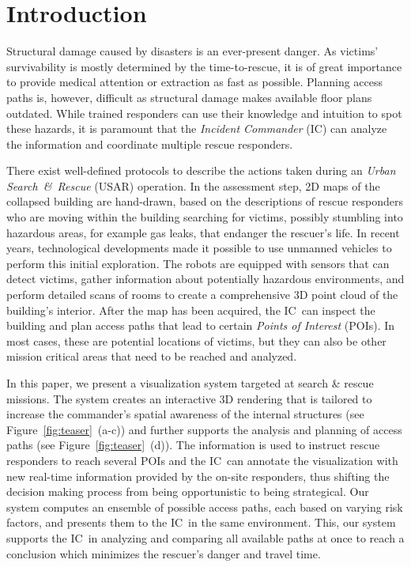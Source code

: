 \documentclass[conference,10pt,letter]{IEEEtran}
\def\IC{IC}
\begin{document}
%
\IEEEpeerreviewmaketitle

\section{Introduction}

Structural damage caused by disasters is an ever-present danger. As victims' survivability is mostly determined by the time-to-rescue, it is of great importance to provide medical attention or extraction as fast as possible. Planning access paths is, however, difficult as structural damage makes available floor plans outdated. While trained responders can use their knowledge and intuition to spot these hazards, it is paramount that the \emph{Incident Commander} (IC) can analyze the information and coordinate multiple rescue responders.

There exist well-defined protocols to describe the actions taken during an \emph{Urban Search~\&~Rescue} (USAR) operation. In the assessment step, 2D maps of the collapsed building are hand-drawn, based on the descriptions of rescue responders who are moving within the building searching for victims, possibly stumbling into hazardous areas, for example gas leaks, that endanger the rescuer's life. In recent years, technological developments made it possible to use unmanned vehicles to perform this initial exploration. The robots are equipped with sensors that can detect victims, gather information about potentially hazardous environments, and perform detailed scans of rooms to create a comprehensive 3D point cloud of the building's interior. After the map has been acquired, the \IC\ can inspect the building and plan access paths that lead to certain \emph{Points of Interest} (POIs). In most cases, these are potential locations of victims, but they can also be other mission critical areas that need to be reached and analyzed.

In this paper, we present a visualization system targeted at search \& rescue missions. The system creates an interactive 3D rendering that is tailored to increase the commander's spatial awareness of the internal structures (see Figure~\ref{fig:teaser}~(a-c)) and further supports the analysis and planning of access paths (see Figure~\ref{fig:teaser}~(d)). The information is used to instruct rescue responders to reach several POIs and the \IC\ can annotate the visualization with new real-time information provided by the on-site responders, thus shifting the decision making process from being opportunistic to being strategical. Our system computes an ensemble of possible access paths, each based on varying risk factors, and presents them to the \IC\ in the same environment. This, our system supports the \IC\ in analyzing and comparing all available paths at once to reach a conclusion which minimizes the rescuer's danger and travel time.
\end{document}
